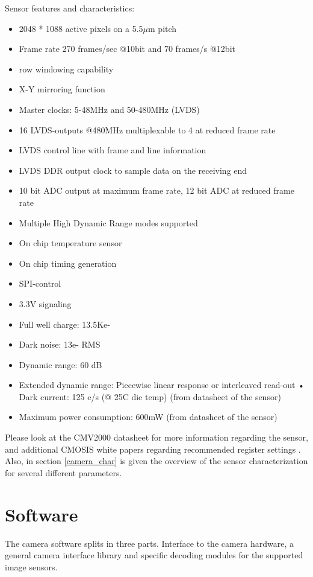 Sensor features and characteristics:
\begin{itemize}
\item  2048 * 1088 active pixels on a 5.5$\mu$m pitch
\item Frame rate 270 frames/sec @10bit and 70 frames/s @12bit
\item row windowing capability
\item X-Y mirroring function
\item Master clocks: 5-48MHz and 50-480MHz (LVDS)
\item 16 LVDS-outputs @480MHz multiplexable to 4 at reduced frame rate
\item LVDS control line with frame and line information
\item LVDS DDR output clock to sample data on the receiving end
\item 10 bit ADC output at maximum frame rate, 12 bit ADC at reduced frame rate
\item Multiple High Dynamic Range modes supported
\item On chip temperature sensor
\item On chip timing generation
\item SPI-control
\item 3.3V signaling
\item Full well charge: 13.5Ke-
\item Dark noise: 13e- RMS
\item Dynamic range: 60 dB
\item Extended dynamic range: Piecewise linear response or interleaved read-out • Dark current: 125 e/s (@ 25C die temp) (from datasheet of the sensor)
\item Maximum power consumption: 600mW (from datasheet of the sensor)
\end{itemize}

Please look at the CMV2000 datasheet for more information regarding the sensor, and additional CMOSIS white papers regarding recommended register settings \cite{CMOSIS:CMV2000}. Also, in section \ref{camera_char} is given the overview of the sensor characterization for several different parameters.

\section{Software}

The camera software splits in three parts. Interface to the camera hardware, a general camera interface library and specific decoding modules for the supported image sensors.

